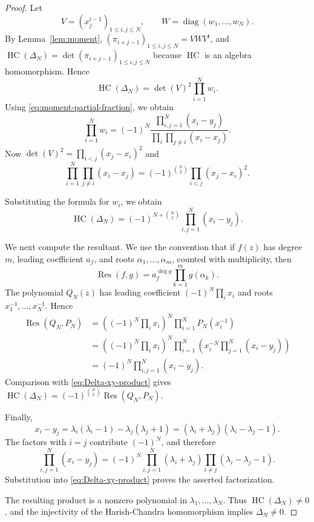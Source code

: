 \documentclass[11pt]{amsart}
\numberwithin{equation}{section}
\theoremstyle{definition}
\theoremstyle{remark}
\newcommand{\HC}{\operatorname{HC}}
\begin{document}
\begin{proof}
Let
\[
 V=(x_j^{i-1})_{1\leq i,j\leq N},
 \qquad
 W=\operatorname{diag}(w_1,\ldots,w_N).
\]
By Lemma~\ref{lem:moment}, \((\pi_{i+j-1})_{1\leq i,j\leq N}=VWV^{\mathsf t}\),
and \(\HC(\Delta_N)=\det(\pi_{i+j-1})_{1\leq i,j\leq N}\) because \(\HC\) is an
algebra homomorphism.  Hence
\[
 \HC(\Delta_N)=\det(V)^2\prod_{i=1}^N w_i .
\]
Using \eqref{eq:moment-partial-fraction}, we obtain
\[
 \prod_{i=1}^Nw_i
 =
 (-1)^N
 \frac{\prod_{i,j=1}^N(x_i-y_j)}
      {\prod_i\prod_{j\neq i}(x_i-x_j)}.
\]
Now $\det(V)^2=\prod_{i<j}(x_j-x_i)^2$
and
\[
 \prod_{i=1}^N\prod_{j\neq i}(x_i-x_j)
 =(-1)^{\binom N2}\prod_{i<j}(x_j-x_i)^2.
\]

Substituting the formula for \(w_i\), we obtain
\begin{equation}
 \HC(\Delta_N)
 =(-1)^{N+\binom N2}\prod_{i,j=1}^N(x_i-y_j).
 \label{eq:Delta-xy-product}
\end{equation}

We next compute the resultant.  We use the convention that if
\(f(z)\) has degree \(m\), leading coefficient \(a_f\), and roots
\(\alpha_1,\ldots,\alpha_m\), counted with multiplicity, then
\[
 \operatorname{Res}(f,g)
 =
 a_f^{\deg g}\prod_{k=1}^m g(\alpha_k).
\] The polynomial \(Q_N(z)\) has leading coefficient
\((-1)^N\prod_i x_i\) and roots \(x_1^{-1},\ldots,x_N^{-1}\). Hence
\begin{align*}
 \operatorname{Res}(Q_N,P_N)
 &=
 \left((-1)^N\prod_i x_i\right)^{\!N}
 \prod_{i=1}^N P_N(x_i^{-1})\\
 &=
 \left((-1)^N\prod_i x_i\right)^{\!N}
 \prod_{i=1}^N
 \left(x_i^{-N}\prod_{j=1}^N(x_i-y_j)\right)\\
 &=
 (-1)^N\prod_{i,j=1}^N(x_i-y_j).
\end{align*}
Comparison with \eqref{eq:Delta-xy-product} gives $\HC(\Delta_N)
 =(-1)^{\binom N2}\operatorname{Res}(Q_N,P_N).$

Finally,
\[
 x_i-y_j
 =\lambda_i(\lambda_i-1)-\lambda_j(\lambda_j+1)
 =(\lambda_i+\lambda_j)(\lambda_i-\lambda_j-1).
\]
The factors with \(i=j\) contribute \((-1)^N\), and therefore
\[
 \prod_{i,j=1}^N(x_i-y_j)
 =
 (-1)^N
 \prod_{i,j=1}^N(\lambda_i+\lambda_j)
 \prod_{i\neq j}(\lambda_i-\lambda_j-1).
\]
Substitution into \eqref{eq:Delta-xy-product} proves the asserted
factorization.

The resulting product is a nonzero polynomial in
\(\lambda_1,\ldots,\lambda_N\).  Thus
\(\HC(\Delta_N)\neq0\), and the injectivity of the Harish-Chandra
homomorphism implies \(\Delta_N\neq0\).
\end{proof}
\end{document}
